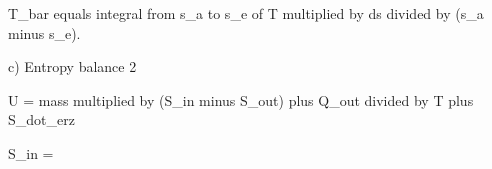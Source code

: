 T_bar equals integral from s_a to s_e of T multiplied by ds divided by (s_a minus s_e).

c) Entropy balance 2  

U = mass multiplied by (S_in minus S_out) plus Q_out divided by T plus S_dot_erz  

S_in =
